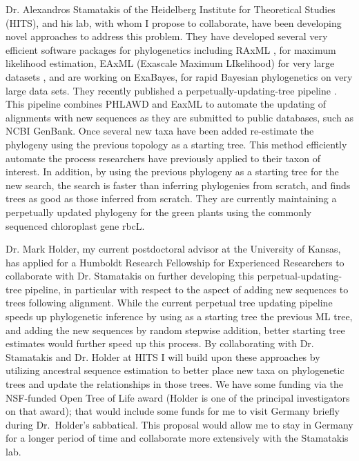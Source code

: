 \documentclass[10pt]{article}
\begin{document}
Dr. Alexandros Stamatakis of the Heidelberg Institute for Theoretical Studies (HITS), and his lab, with whom I propose to collaborate, have been developing novel approaches to address this problem.
They have developed several very efficient software packages for phylogenetics including RAxML \cite{stamatakis_RAxML_2014},\cite{stamatakis_RAxML-Light:_2012}\cite{stamatakis_raxml-vi-hpc:_2006} for maximum likelihood estimation, EAxML (Exascale Maximum LIkelihood) for very large datasets  \cite{Stamatakis_novel_2013} , and are working on ExaBayes, for rapid Bayesian phylogenetics on very large data sets.
They recently published a perpetually-updating-tree pipeline \cite{izquierdo-carrasco_pumper:_2014}. 
This pipeline combines PHLAWD \cite{smith_mega-phylogeny_2009} and EaxML \cite{Stamatakis_novel_2013} to automate the updating of alignments with new sequences as they are submitted to public databases, such as NCBI GenBank. 
Once several new taxa have been added re-estimate the phylogeny using the previous topology as a starting tree. 
This method efficiently automate the process researchers have previously applied to their taxon of interest. 
In addition, by using the previous phylogeny as a starting tree for the new search, the search is faster than inferring phylogenies from scratch, and finds trees as good as those inferred from scratch. 
They  are currently maintaining a perpetually updated phylogeny for the green plants using the commonly sequenced chloroplast gene rbcL.

Dr. Mark Holder, my current postdoctoral advisor at the University of Kansas, has applied for a Humboldt Research Fellowship for Experienced Researchers to collaborate with Dr. 
Stamatakis on further developing this perpetual-updating-tree pipeline, in particular with respect to the aspect of adding new sequences to trees following alignment. 
While the current perpetual tree updating pipeline speeds up phylogenetic inference by using as a starting tree the previous ML tree, and adding the new sequences by random stepwise addition, better starting tree estimates would further speed up this process.
By collaborating with Dr. Stamatakis and Dr. Holder at HITS I will build upon these approaches by utilizing ancestral sequence estimation to better place new taxa on phylogenetic trees and update the relationships in those trees.
We have some funding via the NSF-funded Open Tree of Life award (Holder is one of the principal investigators on that award); that would include some funds for me to visit Germany briefly during Dr.~Holder's sabbatical.
This proposal would allow me to stay in Germany for a longer period of time and collaborate more extensively with the Stamatakis lab.
\end{document}
